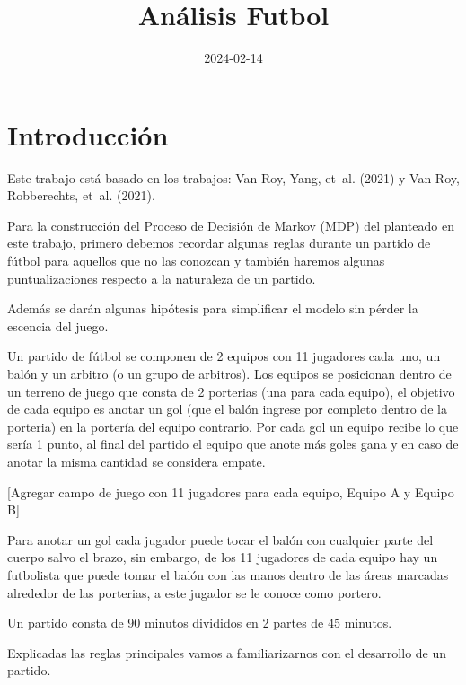 \documentclass[
  us-letterpaper,
  DIV=11,
  numbers=noendperiod]{scrreprt}
\title{Análisis Futbol}
\author{}
\date{2024-02-14}
\renewcommand*\contentsname{Tabla de contenidos}
\newcommand\contentsname{Tabla de contenidos}
\begin{document}
\maketitle

\renewcommand*\contentsname{Tabla de contenidos}
{
\hypersetup{linkcolor=}
\setcounter{tocdepth}{2}
\tableofcontents
}


\chapter*{Introducción}\label{introducciuxf3n}


Este trabajo está basado en los trabajos: Van Roy, Yang, et~al. (2021) y
Van Roy, Robberechts, et~al. (2021).

Para la construcción del Proceso de Decisión de Markov (MDP) del
planteado en este trabajo, primero debemos recordar algunas reglas
durante un partido de fútbol para aquellos que no las conozcan y también
haremos algunas puntualizaciones respecto a la naturaleza de un partido.

Además se darán algunas hipótesis para simplificar el modelo sin pérder
la escencia del juego.

Un partido de fútbol se componen de 2 equipos con 11 jugadores cada uno,
un balón y un arbitro (o un grupo de arbitros). Los equipos se
posicionan dentro de un terreno de juego que consta de 2 porterias (una
para cada equipo), el objetivo de cada equipo es anotar un gol (que el
balón ingrese por completo dentro de la porteria) en la portería del
equipo contrario. Por cada gol un equipo recibe lo que sería 1 punto, al
final del partido el equipo que anote más goles gana y en caso de anotar
la misma cantidad se considera empate.

{[}Agregar campo de juego con 11 jugadores para cada equipo, Equipo A y
Equipo B{]}

Para anotar un gol cada jugador puede tocar el balón con cualquier parte
del cuerpo salvo el brazo, sin embargo, de los 11 jugadores de cada
equipo hay un futbolista que puede tomar el balón con las manos dentro
de las áreas marcadas alrededor de las porterias, a este jugador se le
conoce como portero.

Un partido consta de 90 minutos divididos en 2 partes de 45 minutos.

Explicadas las reglas principales vamos a familiarizarnos con el
desarrollo de un partido.
\end{document}
